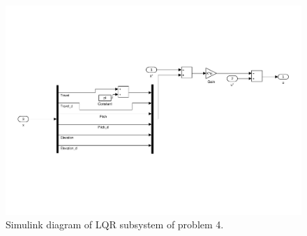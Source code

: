 \begin{figure}[h]
	\centering
	\includegraphics[trim=0 150 0 150,clip,width = \textwidth]{figures/problem4_lqr_simulink.pdf}
	\caption{Simulink diagram of LQR subsystem of problem 4.}
	\label{fig:problem4_lqr_simulink}
\end{figure}

